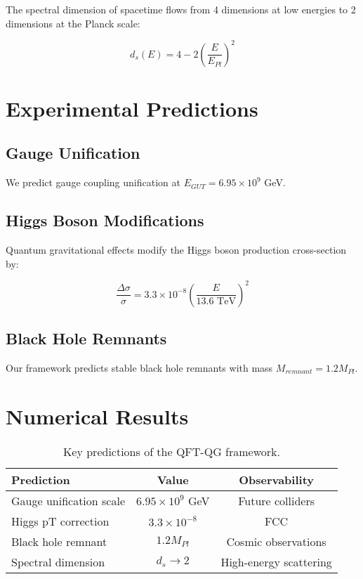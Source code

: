 \documentclass[prd,superscriptaddress,showpacs]{revtex4-1}
\begin{document}
The spectral dimension of spacetime flows from 4 dimensions at low energies to 2 dimensions at the Planck scale:

\begin{equation}
d_s(E) = 4 - 2 \left(\frac{E}{E_{Pl}}\right)^2
\end{equation}

\section{Experimental Predictions}

\subsection{Gauge Unification}

We predict gauge coupling unification at $E_{GUT} = 6.95 \times 10^9$ GeV.

\subsection{Higgs Boson Modifications}

Quantum gravitational effects modify the Higgs boson production cross-section by:

\begin{equation}
\frac{\Delta \sigma}{\sigma} = 3.3 \times 10^{-8} \left(\frac{E}{13.6 \text{ TeV}}\right)^2
\end{equation}

\subsection{Black Hole Remnants}

Our framework predicts stable black hole remnants with mass $M_{remnant} = 1.2 M_{Pl}$.

\section{Numerical Results}

\begin{table}[h]
\centering
\begin{tabular}{lcc}
\hline
\textbf{Prediction} & \textbf{Value} & \textbf{Observability} \\
\hline
Gauge unification scale & $6.95 \times 10^9$ GeV & Future colliders \\
Higgs pT correction & $3.3 \times 10^{-8}$ & FCC \\
Black hole remnant & $1.2 M_{Pl}$ & Cosmic observations \\
Spectral dimension & $d_s \rightarrow 2$ & High-energy scattering \\
\hline
\end{tabular}
\caption{Key predictions of the QFT-QG framework.}
\label{tab:predictions}
\end{table}
\end{document}
